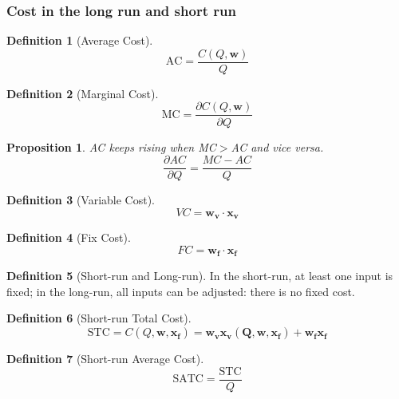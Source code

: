 \documentclass{article}
\theoremstyle{plain}
\newtheorem{prop}[thm]{Proposition}
\theoremstyle{definition}
\newtheorem{defn}{Definition}[section]
\theoremstyle{remark}
\begin{document}
\subsubsection{Cost in the long run and short run}
\begin{defn}[Average Cost]
\begin{equation}
	\text{AC} = \frac{C(Q,\bm{w})}{Q}
\end{equation}
\end{defn}
\begin{defn}[Marginal Cost]
\begin{equation}
	\text{MC} = \frac{\partial C(Q,\bm{w})}{\partial Q}
\end{equation}
\end{defn}

\begin{prop}
AC keeps rising when MC$>$AC and vice versa.
\begin{equation}
	\frac{\partial AC}{\partial Q} = \frac{MC-AC}{Q}
\end{equation}
\end{prop}

\begin{defn}[Variable Cost]
\begin{equation}
	VC  = \bm{w_v}\cdot \bm{x_v}
\end{equation}
\end{defn}
\begin{defn}[Fix Cost]
\begin{equation}
	FC  = \bm{w_f}\cdot \bm{x_f}
\end{equation}
\end{defn}

\begin{defn}[Short-run and Long-run]
In the short-run, at least one input is fixed; in the long-run, all inputs can be adjusted: there is no fixed cost.
\end{defn}

\begin{defn}[Short-run Total Cost]
\begin{equation}
	\text{STC} = C(Q,\bm{w}, \bm{x_f}) = \bm{w_v}\bm{x_v(Q,\bm{w},\bm{x_f})} + \bm{w_f}\bm{x_f}
\end{equation}
\end{defn}

\begin{defn}[Short-run Average Cost]
\begin{equation}
	\text{SATC} = \frac{\text{STC}}{Q}
\end{equation}
\end{defn}
\end{document}
